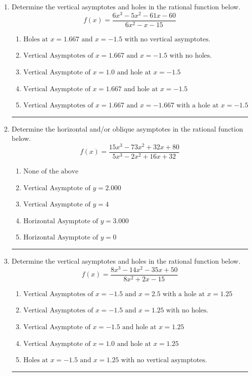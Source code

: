 \documentclass[14pt]{extbook}
\newcommand{\litem}[1]{\item#1\hspace*{-1cm}\rule{\textwidth}{0.4pt}}
\begin{document}
\begin{enumerate}
{\begin{enumerate}[label=\Alph*.]
\end{enumerate} }
\litem{
Determine the vertical asymptotes and holes in the rational function below.\[ f(x) = \frac{6x^{3} -5 x^{2} -61 x -60}{6x^{2} -x -15} \]\begin{enumerate}[label=\Alph*.]
\item \( \text{Holes at } x = 1.667 \text{ and } x = -1.5 \text{ with no vertical asymptotes.} \)
\item \( \text{Vertical Asymptotes of } x = 1.667 \text{ and } x = -1.5 \text{ with no holes.} \)
\item \( \text{Vertical Asymptote of } x = 1.0 \text{ and hole at } x = -1.5 \)
\item \( \text{Vertical Asymptote of } x = 1.667 \text{ and hole at } x = -1.5 \)
\item \( \text{Vertical Asymptotes of } x = 1.667 \text{ and } x = -1.667 \text{ with a hole at } x = -1.5 \)

\end{enumerate} }
\litem{
Determine the horizontal and/or oblique asymptotes in the rational function below.\[ f(x) = \frac{15x^{3} -73 x^{2} +32 x + 80}{5x^{3} -2 x^{2} +16 x + 32} \]\begin{enumerate}[label=\Alph*.]
\item \( \text{None of the above} \)
\item \( \text{Vertical Asymptote of } y = 2.000  \)
\item \( \text{Vertical Asymptote of } y = 4  \)
\item \( \text{Horizontal Asymptote of } y = 3.000  \)
\item \( \text{Horizontal Asymptote of } y = 0  \)

\end{enumerate} }
\litem{
Determine the vertical asymptotes and holes in the rational function below.\[ f(x) = \frac{8x^{3} -14 x^{2} -35 x + 50}{8x^{2} +2 x -15} \]\begin{enumerate}[label=\Alph*.]
\item \( \text{Vertical Asymptotes of } x = -1.5 \text{ and } x = 2.5 \text{ with a hole at } x = 1.25 \)
\item \( \text{Vertical Asymptotes of } x = -1.5 \text{ and } x = 1.25 \text{ with no holes.} \)
\item \( \text{Vertical Asymptote of } x = -1.5 \text{ and hole at } x = 1.25 \)
\item \( \text{Vertical Asymptote of } x = 1.0 \text{ and hole at } x = 1.25 \)
\item \( \text{Holes at } x = -1.5 \text{ and } x = 1.25 \text{ with no vertical asymptotes.} \)

\end{enumerate} }
\end{enumerate}
\end{document}
